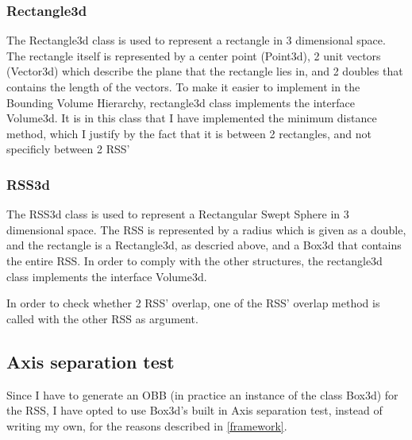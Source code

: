 \subsubsection{Rectangle3d}
\label{rectangle3d}
The Rectangle3d class is used to represent a rectangle in 3 dimensional space. The rectangle itself is represented by a center point (Point3d), 2 unit vectors (Vector3d) which describe the plane that the rectangle lies in, and 2 doubles that contains the length of the vectors. To make it easier to implement in the Bounding Volume Hierarchy, rectangle3d class implements the interface Volume3d.
It is in this class that I have implemented the minimum distance method, which I justify by the fact that it is between 2 rectangles, and not specificly between 2 RSS'

\subsubsection{RSS3d}
\label{RSS3d}
The RSS3d class is used to represent a Rectangular Swept Sphere in 3 dimensional space. The RSS is represented by a radius which is given as a double, and the rectangle is a Rectangle3d, as descried above, and a Box3d that contains the entire RSS. In order to comply with the other structures, the rectangle3d class implements the interface Volume3d.

In order to check whether 2 RSS' overlap, one of the RSS' overlap method is called with the other RSS as argument. 

\subsection{Axis separation test}
\label{implementation_axis_sep}
Since I have to generate an OBB (in practice an instance of the class Box3d) for the RSS, I have opted to use Box3d's built in Axis separation test, instead of writing my own, for the reasons described in \ref{framework}.

